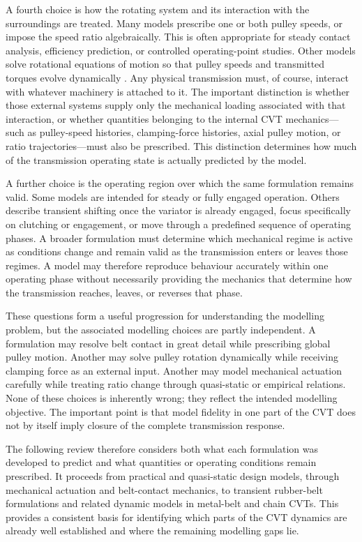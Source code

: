 \documentclass[11pt]{report}
\numberwithin{equation}{section}
\begin{document}
A fourth choice is how the rotating system and its interaction with the surroundings are treated. Many models prescribe one or both pulley speeds, or impose the speed ratio algebraically. This is often appropriate for steady contact analysis, efficiency prediction, or controlled operating-point studies. Other models solve rotational equations of motion so that pulley speeds and transmitted torques evolve dynamically \citep{SrivastavaHaque2007,Ballew2015,DuanEtAl2016}. Any physical transmission must, of course, interact with whatever machinery is attached to it. The important distinction is whether those external systems supply only the mechanical loading associated with that interaction, or whether quantities belonging to the internal CVT mechanics---such as pulley-speed histories, clamping-force histories, axial pulley motion, or ratio trajectories---must also be prescribed. This distinction determines how much of the transmission operating state is actually predicted by the model.

A further choice is the operating region over which the same formulation remains valid. Some models are intended for steady or fully engaged operation. Others describe transient shifting once the variator is already engaged, focus specifically on clutching or engagement, or move through a predefined sequence of operating phases. A broader formulation must determine which mechanical regime is active as conditions change and remain valid as the transmission enters or leaves those regimes. A model may therefore reproduce behaviour accurately within one operating phase without necessarily providing the mechanics that determine how the transmission reaches, leaves, or reverses that phase.

These questions form a useful progression for understanding the modelling problem, but the associated modelling choices are partly independent. A formulation may resolve belt contact in great detail while prescribing global pulley motion. Another may solve pulley rotation dynamically while receiving clamping force as an external input. Another may model mechanical actuation carefully while treating ratio change through quasi-static or empirical relations. None of these choices is inherently wrong; they reflect the intended modelling objective. The important point is that model fidelity in one part of the CVT does not by itself imply closure of the complete transmission response.

The following review therefore considers both what each formulation was developed to predict and what quantities or operating conditions remain prescribed. It proceeds from practical and quasi-static design models, through mechanical actuation and belt-contact mechanics, to transient rubber-belt formulations and related dynamic models in metal-belt and chain CVTs. This provides a consistent basis for identifying which parts of the CVT dynamics are already well established and where the remaining modelling gaps lie.
\end{document}
